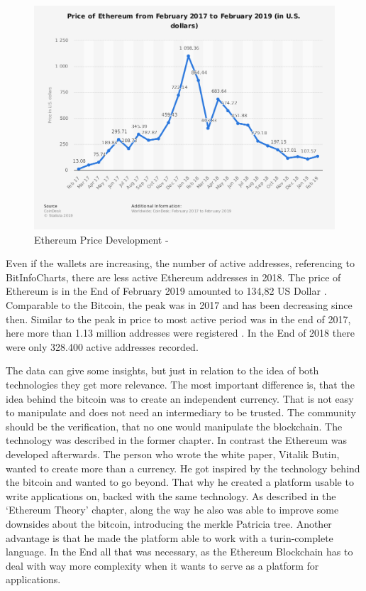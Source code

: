 \begin{figure}[h]
  \centering
  \includegraphics[width=\linewidth]{figures/EthereumPrice.png}
  \caption{Ethereum Price Development - \cite{statPriceEther}}
  \label{fig:marketcapEthereum}
\end{figure}

Even if the wallets are increasing, the number of active addresses, referencing to BitInfoCharts, there are less active Ethereum addresses in 2018. 
The price of Ethereum is in the End of February 2019 amounted to 134,82 US Dollar \cite{statPriceEther}.
Comparable to the Bitcoin, the peak was in 2017 and has been decreasing since then. 
Similar to the peak in price to most active period was in the end of 2017, here more than 1.13 million addresses were registered \cite{Partz2018}. In the End of 2018 there were only 328.400 active addresses recorded. 

The data can give some insights, but just in relation to the idea of both technologies they get more relevance. 
The most important difference is, that the idea behind the bitcoin was to create an independent currency.
That is not easy to manipulate and does not need an intermediary to be trusted. 
The community should be the verification, that no one would manipulate the blockchain. 
The technology was described in the former chapter. 
In contrast the Ethereum was developed afterwards. 
The person who wrote the white paper, Vitalik Butin, wanted to create more than a currency. \cite{vitalikwhite}
He got inspired by the technology behind the bitcoin and wanted to go beyond. 
That why he created a platform usable to write applications on, backed with the same technology. 
As described in the ‘Ethereum Theory’ chapter, along the way he also was able to improve some downsides about the bitcoin, introducing the merkle Patricia tree. 
Another advantage is that he made the platform able to work with a turin-complete language. 
In the End all that was necessary, as the Ethereum Blockchain has to deal with way more complexity when it wants to serve as a platform for applications.
